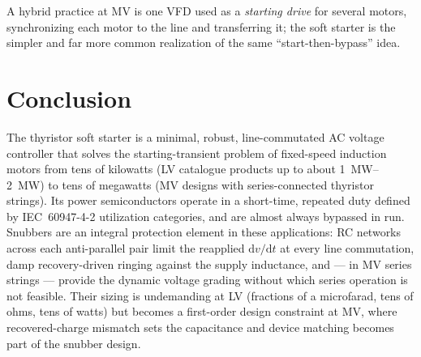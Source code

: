 A hybrid practice at MV is one VFD used as a \emph{starting drive} for
several motors, synchronizing each motor to the line and transferring it;
the soft starter is the simpler and far more common realization of the same
``start-then-bypass'' idea.

\section{Conclusion}

The thyristor soft starter is a minimal, robust, line-commutated AC voltage
controller that solves the starting-transient problem of fixed-speed
induction motors from tens of kilowatts (LV catalogue products up to about
\SIrange{1}{2}{\mega\watt}) to tens of megawatts (MV designs with
series-connected thyristor strings). Its power semiconductors operate in a
short-time, repeated duty defined by IEC~60947-4-2 utilization categories,
and are almost always bypassed in run. Snubbers are an integral protection
element in these applications: RC networks across each anti-parallel pair
limit the reapplied $\mathrm{d}v/\mathrm{d}t$ at every line commutation,
damp recovery-driven ringing against the supply inductance, and --- in MV
series strings --- provide the dynamic voltage grading without which series
operation is not feasible. Their sizing is undemanding at LV (fractions of a
microfarad, tens of ohms, tens of watts) but becomes a first-order design
constraint at MV, where recovered-charge mismatch sets the capacitance and
device matching becomes part of the snubber design.


